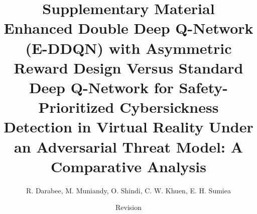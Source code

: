 \documentclass[10pt,a4paper]{article}
\title{Supplementary Material\\[2mm]\large Enhanced Double Deep Q-Network (E-DDQN) with Asymmetric Reward Design Versus Standard Deep Q-Network for Safety-Prioritized Cybersickness Detection in Virtual Reality Under an Adversarial Threat Model: A Comparative Analysis}
\author{R. Darabee, M. Muniandy, O. Shindi, C. W. Khuen, E. H. Sumiea}
\date{Revision}
\begin{document}
\sloppy
\maketitle
\tableofcontents







\end{document}
